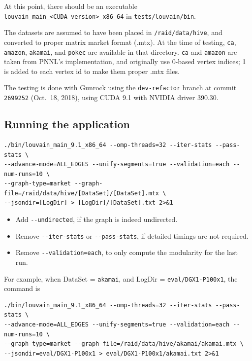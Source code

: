 \documentclass[10pt,oneside]{memoir}
\providecommand{\tightlist}{%
  \setlength{\itemsep}{0pt}\setlength{\parskip}{0pt}}
\begin{document}
At this point, there should be an executable
\texttt{louvain\_main\_\textless{}CUDA\ version\textgreater{}\_x86\_64}
in \texttt{tests/louvain/bin}.

The datasets are assumed to have been placed in
\texttt{/raid/data/hive}, and converted to proper matrix market format
(.mtx). At the time of testing, \texttt{ca}, \texttt{amazon},
\texttt{akamai}, and \texttt{pokec} are available in that directory.
\texttt{ca} and \texttt{amazon} are taken from PNNL's implementation,
and originally use 0-based vertex indices; 1 is added to each vertex id
to make them proper .mtx files.

The testing is done with Gunrock using the \texttt{dev-refactor} branch
at commit \texttt{2699252} (Oct.~18, 2018), using CUDA 9.1 with NVIDIA
driver 390.30.

\hypertarget{running-the-application-4}{%
\subsection{Running the application}\label{running-the-application-4}}

\begin{verbatim}
./bin/louvain_main_9.1_x86_64 --omp-threads=32 --iter-stats --pass-stats \
--advance-mode=ALL_EDGES --unify-segments=true --validation=each --num-runs=10 \
--graph-type=market --graph-file=/raid/data/hive/[DataSet]/[DataSet].mtx \
--jsondir=[LogDir] > [LogDir]/[DataSet].txt 2>&1
\end{verbatim}

\begin{itemize}
\tightlist
\item
  Add \texttt{-\/-undirected}, if the graph is indeed undirected.
\item
  Remove \texttt{-\/-iter-stats} or \texttt{-\/-pass-stats}, if detailed
  timings are not required.
\item
  Remove \texttt{-\/-validation=each}, to only compute the modularity
  for the last run.
\end{itemize}

For example, when DataSet = \texttt{akamai}, and LogDir =
\texttt{eval/DGX1-P100x1}, the command is

\begin{verbatim}
./bin/louvain_main_9.1_x86_64 --omp-threads=32 --iter-stats --pass-stats \
--advance-mode=ALL_EDGES --unify-segments=true --validation=each --num-runs=10 \
--graph-type=market --graph-file=/raid/data/hive/akamai/akamai.mtx \
--jsondir=eval/DGX1-P100x1 > eval/DGX1-P100x1/akamai.txt 2>&1
\end{verbatim}
\end{document}
